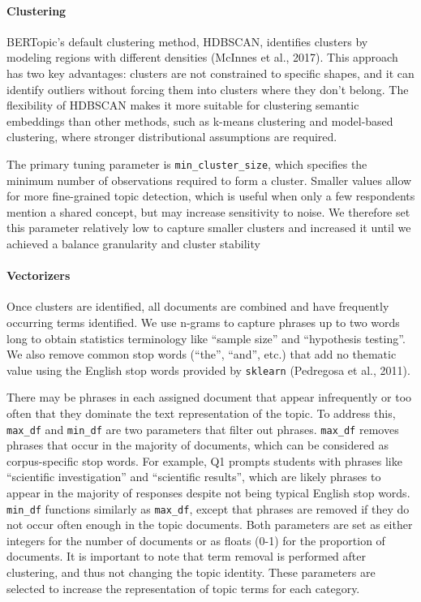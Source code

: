 \documentclass[phd]{nuthesis}
\begin{document}
\paragraph{Clustering}\label{clustering}

BERTopic's default clustering method, HDBSCAN, identifies clusters by
modeling regions with different densities (McInnes et al., 2017). This
approach has two key advantages: clusters are not constrained to
specific shapes, and it can identify outliers without forcing them into
clusters where they don't belong. The flexibility of HDBSCAN makes it
more suitable for clustering semantic embeddings than other methods,
such as k-means clustering and model-based clustering, where stronger
distributional assumptions are required.

The primary tuning parameter is \texttt{min\_cluster\_size}, which
specifies the minimum number of observations required to form a cluster.
Smaller values allow for more fine-grained topic detection, which is
useful when only a few respondents mention a shared concept, but may
increase sensitivity to noise. We therefore set this parameter
relatively low to capture smaller clusters and increased it until we
achieved a balance granularity and cluster stability

\paragraph{Vectorizers}\label{vectorizers}

Once clusters are identified, all documents are combined and have
frequently occurring terms identified. We use n-grams to capture phrases
up to two words long to obtain statistics terminology like ``sample
size'' and ``hypothesis testing''. We also remove common stop words
(``the'', ``and'', etc.) that add no thematic value using the English
stop words provided by \texttt{sklearn} (Pedregosa et al., 2011).

There may be phrases in each assigned document that appear infrequently
or too often that they dominate the text representation of the topic. To
address this, \texttt{max\_df} and \texttt{min\_df} are two parameters
that filter out phrases. \texttt{max\_df} removes phrases that occur in
the majority of documents, which can be considered as corpus-specific
stop words. For example, Q1 prompts students with phrases like
``scientific investigation'' and ``scientific results'', which are
likely phrases to appear in the majority of responses despite not being
typical English stop words. \texttt{min\_df} functions similarly as
\texttt{max\_df}, except that phrases are removed if they do not occur
often enough in the topic documents. Both parameters are set as either
integers for the number of documents or as floats (0-1) for the
proportion of documents. It is important to note that term removal is
performed after clustering, and thus not changing the topic identity.
These parameters are selected to increase the representation of topic
terms for each category.
\end{document}

